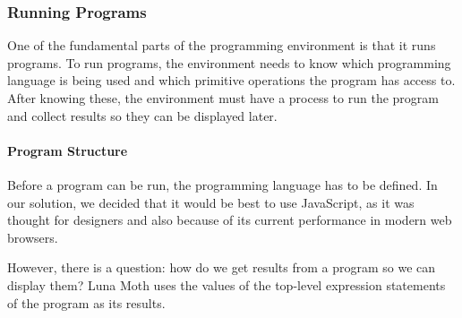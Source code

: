 

\subsubsection{Running Programs}
One of the fundamental parts of the programming environment is that it runs programs.
To run programs, the environment needs to know which programming language is being used and which primitive operations the program has access to.
After knowing these, the environment must have a process to run the program and collect results so they can be displayed later.


\paragraph{Program Structure}
Before a program can be run, the programming language has to be defined.
In our solution, we decided that it would be best to use JavaScript, as it was thought for designers and also because of its current performance in modern web browsers.

However, there is a question: how do we get results from a program so we can display them?
Luna Moth uses the values of the top-level expression statements of the program as its results.

